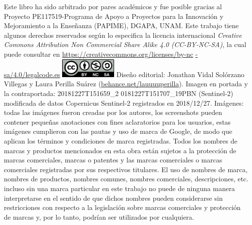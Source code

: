 \setlength{\columnsep}{25pt}
\begin{multicols*}{2}
    \raggedcolumns
    {\scriptsize Este libro ha sido arbitrado por pares académicos y fue posible gracias al Proyecto PE117519-Programa de Apoyo a Proyectos para la Innovación y Mejoramiento a la Enseñanza (PAPIME), DGAPA, UNAM. 
    \linebreak Este trabajo tiene algunos derechos reservados según lo especifica la licencia internacional {\it Creative Commons Attribution Non Commercial Share Alike 4.0 (CC-BY-NC-SA)}, la cual puede consultar en \href{https://creativecommons.org/licenses/by-nc-sa/4.0/legalcode.es}{https://creativecommons.org/licenses/by-nc} \href{https://creativecommons.org/licenses/by-nc -sa/4.0/legalcode.es}{-sa/4.0/legalcode.es}
    \linebreak
    \linebreak
    \begingroup
        \includegraphics[height=28pt]{Img/license}
    \endgroup
    \newline Diseño editorial: Jonathan Vidal Solórzano Villegas y Laura Perilla Suárez (\href{https://behance.net/lauuuuperilla}{behance.net/lauuuuperilla}).
    \newline Imagen en portada y la contraportada: 20181227T151659\_2 0181227T151707\_19PBN (Sentinel-2) modificada de datos Copernicus Sentinel-2 registrados en 2018/12/27. 
    \newline Imágenes: todas las imágenes fueron creadas por los autores, los screenshots pueden contener pequeñas anotaciones con fines aclaratorios para los usuarios, estas imágenes cumplieron con las pautas y uso de marca de Google, de modo que aplican los términos y condiciones de marca registradas. 
    \newline Todos los nombres de marcas y productos mencionados en esta obra están sujetos a la protección de marcas comerciales, marcas o patentes y las marcas comerciales o marcas comerciales registradas por sus respectivos titulares. 
    El uso de nombres de marca, nombres de productos, nombres comunes, nombres comerciales, descripciones, etc. incluso sin una marca particular en este trabajo no puede de ninguna manera interpretarse en el sentido de que dichos nombres pueden considerarse sin restricciones con respecto a la legislación sobre marcas comerciales y protección de marcas y, por lo tanto, podrían ser utilizados por cualquiera.
}
\end{multicols*}
